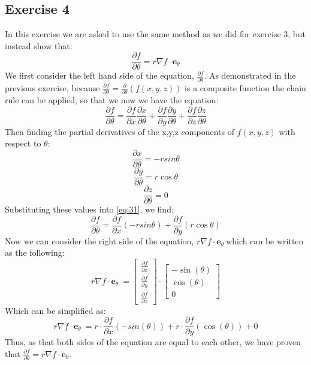 \documentclass{article}
\begin{document}
\subsection{Exercise 4}
In this exercise we are asked to use the same method as we did for exercise 3, but instead show that:
\[\frac{\partial f}{\partial \theta} = r\nabla f \cdot \mathbf{e}_\theta\]
We first consider the left hand side of the equation, $\frac{\partial f}{\partial \theta}$. As demonstrated in the previous exercise, because $\frac{\partial f}{\partial \theta} =\frac{\partial }{\partial \theta} (f(x,y,z))$ is a composite function the chain rule can be applied, so that we now we have the equation:
\begin{equation} \label{eq:31}
\frac{\partial f}{\partial \theta} = \frac{\partial f}{\partial x}\frac{\partial x}{\partial \theta}+\frac{\partial f}{\partial y}\frac{\partial y}{\partial \theta}+\frac{\partial f}{\partial z}\frac{\partial z}{\partial \theta}
\end{equation} 
Then finding the partial derivatives of the x,y,z components of $f(x,y,z)$ with respect to $\theta$:
\begin{equation}
\frac{\partial x}{\partial \theta} = -rsin \theta
\end{equation}
\begin{equation}
\frac{\partial y}{\partial \theta} = r\cos\theta
\end{equation}
\begin{equation}
\frac{\partial z}{\partial \theta} = 0
\end{equation}
 Substituting these values into \ref{eq:31}, we find:
\begin{equation}
\frac{\partial f}{\partial \theta} = \frac{\partial f}{\partial x}(-rsin \theta) + \frac{\partial f}{\partial y}(r\cos\theta)
\end{equation} 
Now we can consider the right side of the equation, $ r\nabla f \cdot \mathbf{e}_\theta\ $which can be written as the following:
\begin{equation}
    r\nabla f \cdot \mathbf{e}_\theta\ = 
    \left[\begin{array}{c}
    \frac{\partial f}{\partial x} 
    \\
     \frac{\partial f}{\partial y} 
    \\
     \frac{\partial f}{\partial z} 
    \end{array}\right]
    \cdot
    \left[\begin{array}{c}
    -\sin (\theta) 
    \\
     \cos (\theta) 
    \\
     0 
    \end{array}\right]
\end{equation} 
Which can be simplified as:
\begin{equation}
    r\nabla f \cdot \mathbf{e}_\theta\ = r\cdot\frac{\partial f}{\partial x}(-sin (\theta))+r\cdot\frac{\partial f}{\partial y}(\cos (\theta)) + 0
\end{equation}
Thus, as that both sides of the equation are equal to each other, we have proven that $\frac{\partial f}{\partial \theta} = r\nabla f \cdot \mathbf{e}_\theta$. 
\end{document}
